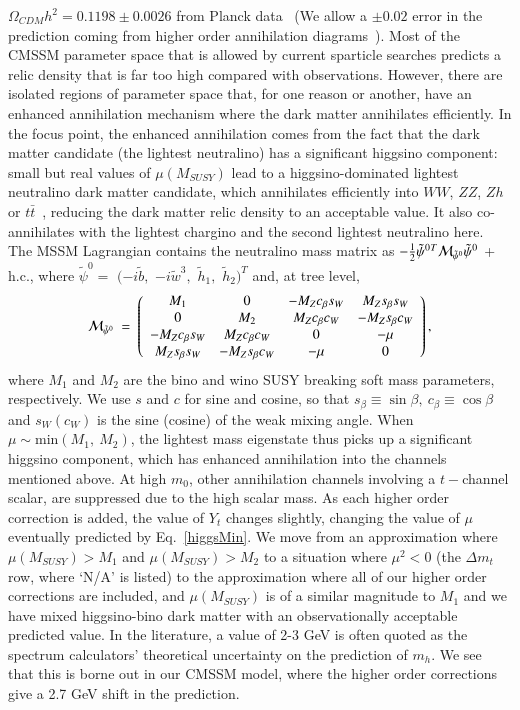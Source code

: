 \documentclass[final,3p,times,pdflatex]{elsarticle}
\begin{document}
$\Omega_{CDM} h^2=0.1198 \pm 0.0026$ from Planck data~\cite{Ade:2013zuv} (We
allow a $\pm 0.02$ error in the prediction coming from higher order
annihilation diagrams~\cite{Baro:2009na}).
Most of the CMSSM parameter space that is allowed by current sparticle
searches predicts a relic density that is far too high compared with
observations. However, there are isolated regions of parameter space that, for
one reason or another, have an enhanced annihilation mechanism where the dark
matter annihilates efficiently. In the focus point, the enhanced annihilation
comes from the fact that the dark matter candidate (the lightest neutralino)
has a significant higgsino component: small but real
values of $\mu(M_{SUSY})$ lead to a higgsino-dominated lightest neutralino dark
matter candidate, which annihilates efficiently into $WW$, $ZZ$, $Zh$ or $t
\bar t$~\cite{Feng:2000gh}, reducing the dark matter relic density to an
acceptable value. It also co-annihilates with the lightest chargino and the
second lightest neutralino here. 
The MSSM Lagrangian contains the neutralino mass matrix as
$-\frac{1}{2}
{\tilde\psi^0}{}^T{\cal M}_{\tilde\psi^0}\tilde\psi^0$ + h.c., where
$\tilde\psi^0 =$ $(-i\tilde b,$ $-i\tilde w^3,$ $\tilde h_1,$ $\tilde
h_2)^T$ and, at tree level,
%
\begin{equation}
{\cal M}_{\tilde\psi^0} \ =\ \left(\begin{array}{cccc} M_1 & 0 &
-M_Zc_\beta s_W & M_Zs_\beta s_W \\ 0 & M_2 & M_Zc_\beta c_W &
-M_Zs_\beta c_W \\ -M_Zc_\beta s_W & M_Zc_\beta c_W & 0 & -\mu \\
M_Zs_\beta s_W & -M_Zs_\beta c_W & -\mu & 0
\end{array} \right),\label{mchi0}
\end{equation}
%
where $M_1$ and $M_2$ are the bino and wino SUSY breaking soft mass
parameters, respectively.
We use $s$ and $c$ for sine and cosine, so that
$s_\beta\equiv\sin\beta,\ c_{\beta}\equiv\cos\beta$ and $s_W (c_W)$ is
the sine (cosine) of the weak mixing angle. When $\mu \sim \text{min}(M_1,\
M_2)$, 
the lightest mass eigenstate thus picks up a significant higgsino component, 
which has enhanced annihilation into the channels mentioned above. At high
$m_0$, other annihilation channels involving a $t-$channel scalar, are 
suppressed due to the high scalar mass. 
As each higher order correction is added, the value of $Y_t$ changes slightly,
changing the value of $\mu$ eventually predicted by Eq.~\ref{higgsMin}. 
We move from an approximation where $\mu(M_{SUSY}) > M_1$ and $\mu(M_{SUSY}) >
M_2$ to a situation where $\mu^2<0$ (the $\Delta m_t$ row, where `N/A' is
listed) to the approximation where all of our higher order corrections are
included, and $\mu(M_{SUSY})$ is of a similar magnitude to $M_1$ and
we have mixed 
higgsino-bino dark matter with an observationally acceptable predicted value.
In the literature,  a value of 2-3 GeV is often quoted as the spectrum
calculators' theoretical uncertainty on the prediction of $m_h$. We see that
this is borne out in our CMSSM model, where the higher order corrections give
a 2.7 GeV shift in the prediction.
\end{document}
